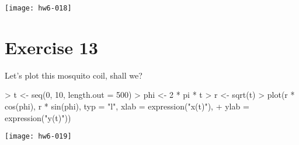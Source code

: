 \documentclass{article}
\begin{document}
\begin{center}
\texttt{[image: hw6-018]}
\end{center}

\section{Exercise 13}
Let's plot this mosquito coil, shall we?
\begin{Schunk}
\begin{Sinput}
> t <- seq(0, 10, length.out = 500)
> phi <- 2 * pi * t
> r <- sqrt(t)
> plot(r * cos(phi), r * sin(phi), typ = "l", xlab = expression("x(t)"), 
+     ylab = expression("y(t)"))
\end{Sinput}
\end{Schunk}

\begin{center}
\texttt{[image: hw6-019]}
\end{center}
\end{document}

